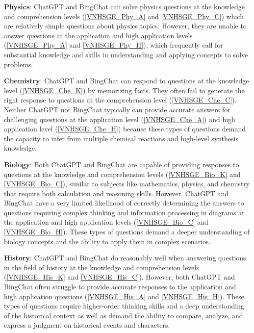 \documentclass{article}
\begin{document}
{	
	\textbf{Physics}: ChatGPT and BingChat can solve physics questions at the knowledge and comprehension levels (\ref{VNHSGE_Phy_A} and \ref{VNHSGE_Phy_C}) which are relatively simple questions about physics topics. However, they are unable to answer questions at the application and high application levels (\ref{VNHSGE_Phy_A} and \ref{VNHSGE_Phy_H}), which frequently call for substantial knowledge and skills in understanding and applying concepts to solve problems.
	

	
	\textbf{Chemistry}: ChatGPT and BingChat can respond to questions at the knowledge level (\ref{VNHSGE_Che_K}) by memorizing facts. They often fail to generate the right response to questions at the comprehension level (\ref{VNHSGE_Che_C}). Neither ChatGPT nor BingChat typically can provide accurate answers for challenging questions at the application level (\ref{VNHSGE_Che_A}) and high application level (\ref{VNHSGE_Che_H}) because these types of questions demand the capacity to infer from multiple chemical reactions and high-level synthesis knowledge. 
	

	
	\textbf{Biology}: Both ChatGPT and BingChat are capable of providing responses to questions at the knowledge and comprehension levels (\ref{VNHSGE_Bio_K} and \ref{VNHSGE_Bio_C}), similar to subjects like mathematics, physics, and chemistry that require both calculation and reasoning skills. However, ChatGPT and BingChat have a very limited likelihood of correctly determining the answers to questions requiring complex thinking and information processing in diagrams at the application and high application levels (\ref{VNHSGE_Bio_C} and \ref{VNHSGE_Bio_H}). These types of questions demand a deeper understanding of biology concepts and the ability to apply them in complex scenarios.
	
	 
	
	\textbf{History}: ChatGPT and BingChat do reasonably well when answering questions in the field of history at the knowledge and comprehension levels (\ref{VNHSGE_His_K} and \ref{VNHSGE_His_C}). However,  both ChatGPT and BingChat often struggle to provide accurate responses to the application and high application questions (\ref{VNHSGE_His_A} and \ref{VNHSGE_His_H}). These types of questions require higher-order thinking skills and a deep understanding of the historical context as well as demand the ability to compare, analyze, and express a judgment on historical events and characters. 
	

}
\end{document}
